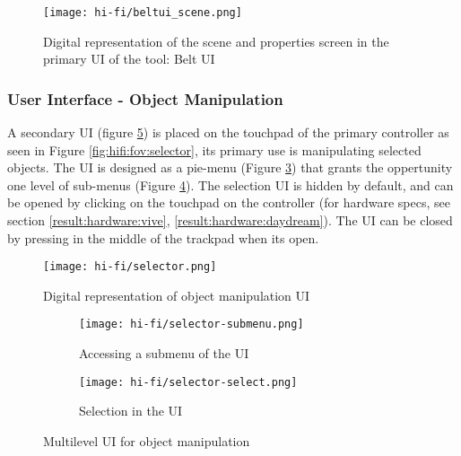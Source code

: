
\begin{figure}
  \centering
  \texttt{[image: hi-fi/beltui\_scene.png]}
\caption{Digital representation of the scene and properties screen in the primary UI of the tool: Belt UI}
\label{fig:hifi:scenescreen}
\end{figure}

\subsubsection{User Interface - Object Manipulation}
\label{result:hifi:selector}
A secondary UI (figure \ref{fig:hifi:selector}) is placed on the touchpad of the primary controller as seen in Figure \ref{fig:hifi:fov:selector}, its primary use is manipulating selected objects. The UI is designed as a pie-menu (Figure \ref{fig:hifi:selector:select}) that grants the oppertunity one level of sub-menus (Figure \ref{fig:hifi:selector:submenu}). The selection UI is hidden by default, and can be opened by clicking on the touchpad on the controller (for hardware specs, see section \ref{result:hardware:vive}, \ref{result:hardware:daydream}). The UI can be closed by pressing in the middle of the trackpad when its open.

\begin{figure}
  \centering
  \texttt{[image: hi-fi/selector.png]}
\caption{Digital representation of object manipulation UI}
\label{fig:hifi:selector}
\end{figure}

\begin{figure}
\begin{subfigure}{.5\textwidth}
  \centering
  \texttt{[image: hi-fi/selector-submenu.png]}
  \caption{Accessing a submenu of the UI}
  \label{fig:hifi:selector:select}
\end{subfigure}%
\begin{subfigure}{.5\textwidth}
  \centering
  \texttt{[image: hi-fi/selector-select.png]}
  \caption{Selection in the UI}
  \label{fig:hifi:selector:submenu}
\end{subfigure}
\caption{Multilevel UI for object manipulation}
\label{fig:hifi:selector}
\end{figure}

